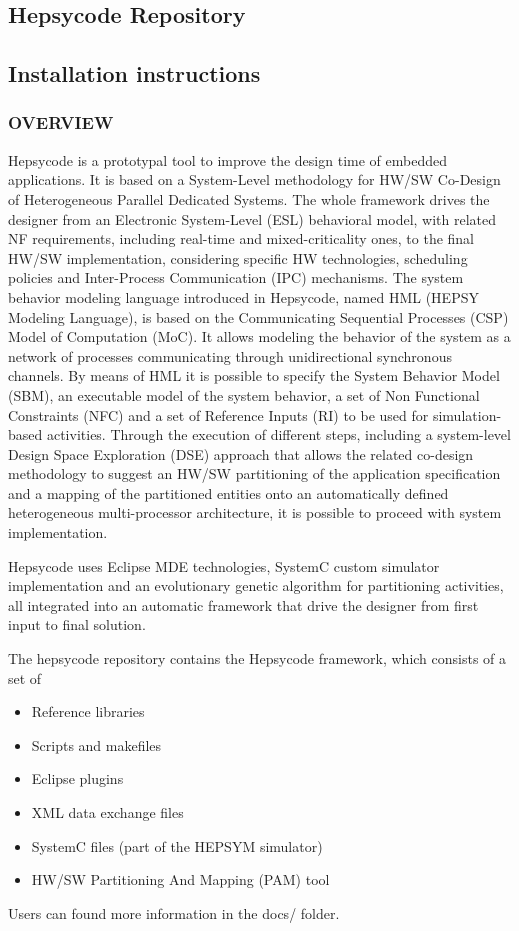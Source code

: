 \begin{appendices}
\chapter{Hepsycode Repository} \label{ch:appendixa}
%
\section{Installation instructions}
\subsection{OVERVIEW}
Hepsycode is a prototypal tool to improve the design time of embedded applications. It is based on a System-Level methodology for HW/SW Co-Design of Heterogeneous Parallel Dedicated Systems. The whole framework drives the designer from an Electronic System-Level (ESL) behavioral model, with related NF requirements, including real-time and mixed-criticality ones, to the final HW/SW implementation, considering specific HW technologies, scheduling policies and Inter-Process Communication (IPC) mechanisms. The system behavior modeling language introduced in Hepsycode, named HML (HEPSY Modeling Language), is based on the Communicating Sequential Processes (CSP) Model of Computation (MoC). It allows modeling the behavior of the system as a network of processes communicating through unidirectional synchronous channels. By means of HML it is possible to specify the System Behavior Model (SBM), an executable model of the system behavior, a set of Non Functional Constraints (NFC) and a set of Reference Inputs (RI) to be used for simulation-based activities. Through the execution of different steps, including a system-level Design Space Exploration (DSE) approach that allows the related co-design methodology to suggest an HW/SW partitioning of the application specification and a mapping of the partitioned entities onto an automatically defined heterogeneous multi-processor architecture, it is possible to proceed with system implementation. \par
Hepsycode uses Eclipse MDE technologies, SystemC custom simulator implementation and an evolutionary genetic algorithm for partitioning activities, all integrated into an automatic framework that drive the designer from first input to final solution. \par
The hepsycode repository contains the Hepsycode framework, which consists of a set of
%
\begin{itemize}
    \item Reference libraries
    \item Scripts and makefiles
    \item Eclipse plugins
    \item XML data exchange files
    \item SystemC files (part of the HEPSYM simulator)
    \item HW/SW Partitioning And Mapping (PAM) tool
\end{itemize}
%
Users can found more information in the docs/ folder.
%

\end{appendices}
